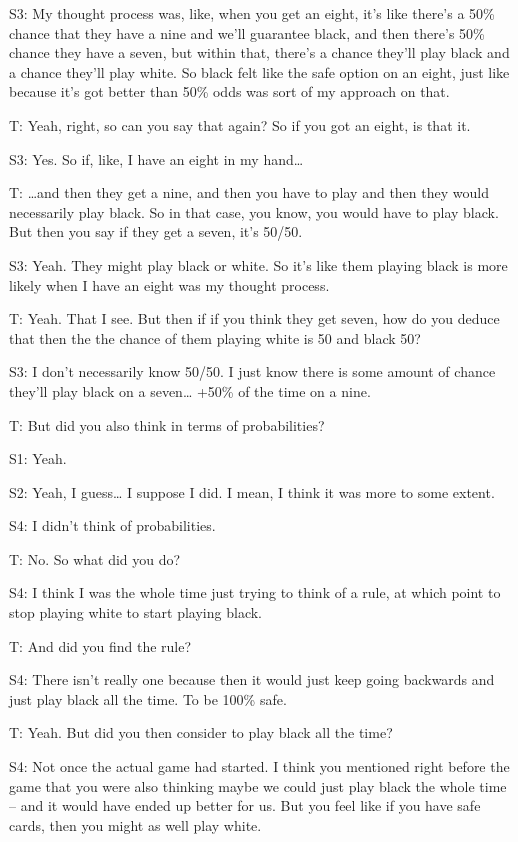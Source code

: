 \documentclass[a4paper,superscriptaddress,nofootinbib]{revtex4}
\begin{document}
S3: My thought process was, like, when you get an eight, it's like there's a 50\% chance that they have a nine and we'll guarantee black, and then there's 50\% chance they have a seven, but within that, there's a chance they'll play black and a chance they'll play white. So black felt like the safe option on an eight, just like because it's got better than 50\% odds was sort of my approach on that. 

T: Yeah, right, so can you say that again? So if you got an eight, is that it. 

S3: Yes. So if, like, I have an eight in my hand…

T: …and then they get a nine, and then you have to play and then they would necessarily play black. So in that case, you know, you would have to play black. But then you say if they get a seven, it's 50/50.

S3: Yeah. They might play black or white. So it's like them playing black is more likely when I have an eight was my thought process.

T: Yeah. That I see. But then if if you think they get seven, how do you deduce that then the the chance of them playing white is 50 and black 50? 

S3: I don't necessarily know 50/50. I just know there is some amount of chance they'll play black on a seven… +50\% of the time on a nine.

T: But did you also think in terms of probabilities? 

S1: Yeah.

S2: Yeah, I guess… I suppose I did. I mean, I think it was more to some extent. 

S4: I didn't think of probabilities. 

T: No. So what did you do? 

S4: I think I was the whole time just trying to think of a rule, at which point to stop playing white to start playing black.

T: And did you find the rule? 

S4: There isn't really one because then it would just keep going backwards and just play black all the time. To be 100\% safe. 

T: Yeah. But did you then consider to play black all the time? 

S4: Not once the actual game had started. I think you mentioned right before the game that you were also thinking maybe we could just play black the whole time – and it would have ended up better for us. But you feel like if you have safe cards, then you might as well play white. 
\end{document}
